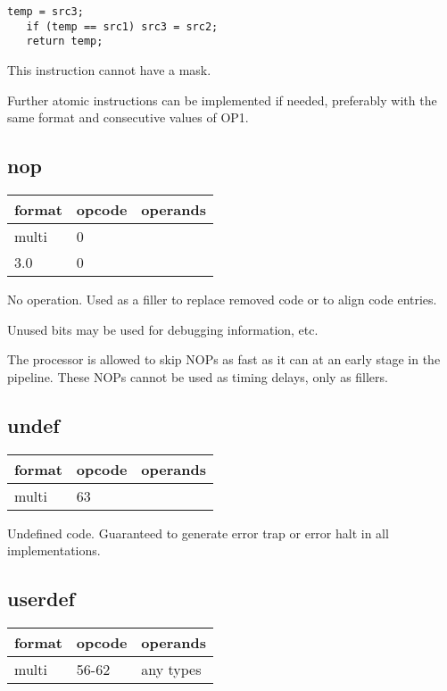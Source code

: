 \documentclass[forwardcom.tex]{subfiles}
\begin{document}
\begin{lstlisting}[frame=none]
   temp = src3;
   if (temp == src1) src3 = src2;
   return temp;
\end{lstlisting}

This instruction cannot have a mask.
\vv

Further atomic instructions can be implemented if needed, preferably with the same format and consecutive values of OP1.
\vv


\subsection{nop}
\label{table:nopInstruction}
\begin{tabular}{|p{12mm}|p{15mm}|p{100mm}|}
\hline
\bfseries format & \bfseries opcode & \bfseries operands \\ \hline
multi &  0 & \\ \hline
3.0   &  0 & \\ \hline
\end{tabular}
\vv

No operation. Used as a filler to replace removed code or to align code entries.
\vv

Unused bits may be used for debugging information, etc.
\vv

The processor is allowed to skip NOPs as fast as it can at an early stage in the pipeline. These NOPs cannot be used as timing delays, only as fillers.
\vv


\subsection{undef}
\label{table:undefInstruction}
\begin{tabular}{|p{12mm}|p{15mm}|p{100mm}|}
\hline
\bfseries format & \bfseries opcode & \bfseries operands \\ \hline
multi & 63 & \\ \hline
\end{tabular}
\vv

Undefined code. Guaranteed to generate error trap or error halt in all implementations.
\vv

\subsection{userdef}
\label{table:userdefInstruction}
\begin{tabular}{|p{12mm}|p{15mm}|p{100mm}|}
\hline
\bfseries format & \bfseries opcode & \bfseries operands \\ \hline
multi & 56-62 & any types \\ \hline
\end{tabular}
\vv
\end{document}

